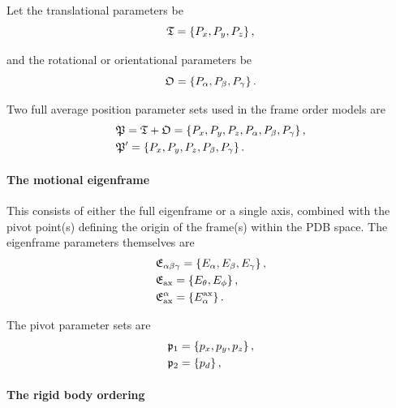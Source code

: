 Let the translational parameters be
\begin{equation}
    \mathfrak{T} = \left\{ P_x, P_y, P_z \right\},
\end{equation}

and the rotational or orientational parameters be
\begin{equation}
    \mathfrak{O} = \left\{ P_\alpha, P_\beta, P_\gamma \right\}.
\end{equation}

Two full average position parameter sets used in the frame order models are
\begin{subequations}
\begin{align}
    &\mathfrak{P} = \mathfrak{T} + \mathfrak{O} = \left\{ P_x, P_y, P_z, P_\alpha, P_\beta, P_\gamma \right\}, \\
    &\mathfrak{P}' = \left\{ P_x, P_y, P_z, P_\beta, P_\gamma \right\}.
\end{align}
\end{subequations}


\paragraph{The motional eigenframe}

This consists of either the full eigenframe or a single axis, combined with the pivot point(s) defining the origin of the frame(s) within the PDB space.
The eigenframe parameters themselves are
\begin{subequations}
\begin{align}
    &\mathfrak{E}_{\alpha\beta\gamma} = \left\{ E_\alpha, E_\beta, E_\gamma \right\}, \\
    &\mathfrak{E}_\textrm{ax} = \left\{ E_\theta, E_\phi \right\}, \\
    &\mathfrak{E}^\alpha_\textrm{ax} = \left\{ E_\alpha^{\textrm{ax}} \right\}.
\end{align}
\end{subequations}

The pivot parameter sets are
\begin{subequations}
\begin{align}
    &\mathfrak{p}_1 = \left\{ p_x, p_y, p_z \right\}, \\
    &\mathfrak{p}_2 = \left\{ p_d \right\},
\end{align}
\end{subequations}


\paragraph{The rigid body ordering}

